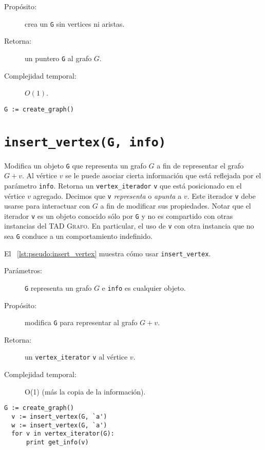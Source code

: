 \documentclass[%
    a4paper,%
    fontsize=12pt,%
    DIV=12,
    twoside,%
    openright,%
    titlepage=true,%
    headsepline,%
    toc=bibliography,%
    parskip=half,%
    cleardoublepage=empty,%
    headings=big,%
]{scrbook}
\makeatletter
\newcommand{\Grafo}{\textsc{Grafo}\xspace}
\newcommand{\Code}[2][]{\lstinline[basicstyle={\ttfamily},#1]@#2@}
\makeatother
\begin{document}
\begin{description}
  \item [Propósito:] crea un \Code{G} sin vertices ni aristas.
  \item [Retorna:] un puntero \Code{G} al grafo $G$.
  \item [Complejidad temporal:]  $O(1)$.
\end{description}


\begin{lstlisting}[caption={Ejemplo de uso de \Code{create\_graph}},gobble=2,float=ht,label={lst:pseudo:create_graph},emph={create_graph}]
  G := create_graph()
\end{lstlisting}

\section{\texorpdfstring{\Code{insert_vertex(G, info)}}{insert\_vertex(G, info)}}
\label{sec:tad grafo:insert-vertex}

Modifica un objeto \Code{G} que representa un grafo $G$ a fin de representar el grafo $G + v$.  Al vértice $v$ se le puede asociar cierta información que está reflejada por el parámetro \Code{info}.  Retorna un \Code{vertex_iterador} \Code{v} que está posicionado en el vértice $v$ agregado.  Decimos que \Code{v} \emph{representa} o \emph{apunta} a $v$.  Este iterador \Code{v} debe usarse para interactuar con $G$ a fin de modificar sus propiedades.  Notar que el iterador \Code{v} es un objeto conocido sólo por \Code{G} y no es compartido con otras instancias del TAD \Grafo.  En particular, el uso de \Code{v} con otra instancia que no sea \Code{G} conduce a un comportamiento indefinido.

El \lstlistingname~\ref{lst:pseudo:insert_vertex} muestra cómo usar \Code{insert_vertex}.
  
\begin{description}
  \item [Parámetros:] \Code{G} representa un grafo $G$ e \Code{info} es cualquier objeto.
  \item [Propósito:] modifica \Code{G} para representar al grafo $G + v$.
  \item [Retorna:] un \Code{vertex_iterator} \Code{v} al vértice $v$.
  \item [Complejidad temporal:] O(1) (más la copia de la información).
\end{description}


\begin{lstlisting}[caption={Ejemplo de uso de \Code{insert_vertex} para imprimir ``aa''. Ver Sección~\ref{sec:tad grafo:vertex-iterator} para más información de \Code{vertex_iterator}.},gobble=2,float=ht,label={lst:pseudo:insert_vertex},emph={insert_vertex}]
  G := create_graph()
  v := insert_vertex(G, `a')
  w := insert_vertex(G, `a')
  for v in vertex_iterator(G):
      print get_info(v)
\end{lstlisting}
\end{document}
